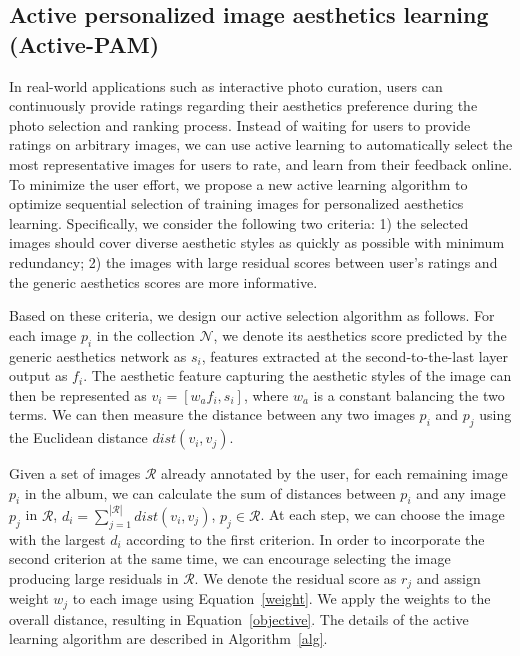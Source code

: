 
\subsection{Active personalized image aesthetics learning (Active-PAM)}\label{Active}
In real-world applications such as interactive photo curation, users can continuously provide ratings regarding their aesthetics preference during the photo selection and ranking process\cite{yeh2010personalized, yeh2014personalized}. Instead of waiting for users to provide ratings on arbitrary images, we can use active learning to automatically select the most representative images for users to rate, and learn from their feedback online. To minimize the user effort, we propose a new active learning algorithm to optimize sequential selection of training images for personalized aesthetics learning. Specifically, we consider the following two criteria: 1) the selected images should cover diverse aesthetic styles as quickly as possible with minimum redundancy; 2) the images with large residual scores between user's ratings and the generic aesthetics scores are more informative. 

Based on these criteria, we design our active selection algorithm as follows. For each image $p_i$ in the collection $\mathcal{N}$, we denote its aesthetics score predicted by the generic aesthetics network as $s_i$, features extracted at the second-to-the-last layer output as $f_i$. The aesthetic feature capturing the aesthetic styles of the image can then be represented as $v_i = [w_{a}f_i, s_i]$, where $w_a$ is a constant balancing the two terms. We can then measure the distance between any two images $p_i$ and $p_j$ using the Euclidean distance $dist(v_i, v_j)$.

Given a set of images $\mathcal{R}$ already annotated by the user, for each remaining image $p_i$ in the album, we can calculate the sum of distances between $p_i$ and any image $p_j$ in $\mathcal{R}$, $ d_i = \sum_{j=1}^{|\mathcal{R}|} dist(v_i, v_j)$, $p_j\in \mathcal{R}$. At each step, we can choose the image with the largest $d_i$ according to the first criterion. In order to incorporate the second criterion at the same time, we can encourage selecting the image producing large residuals in $\mathcal{R}$. We denote the residual score as $r_j$ and assign weight $w_j$ to each image using Equation~\ref{weight}. We apply the weights to the overall distance, resulting in Equation~\ref{objective}. The details of the active learning algorithm are described in Algorithm~\ref{alg}.


